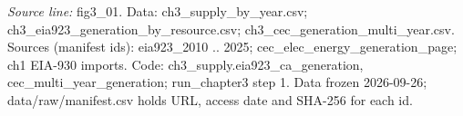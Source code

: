 {\scriptsize\textit{Source line:} fig3\_\allowbreak{}01. Data: ch3\_\allowbreak{}supply\_\allowbreak{}by\_\allowbreak{}year.csv; ch3\_\allowbreak{}eia923\_\allowbreak{}generation\_\allowbreak{}by\_\allowbreak{}resource.csv; ch3\_\allowbreak{}cec\_\allowbreak{}generation\_\allowbreak{}multi\_\allowbreak{}year.csv. Sources (manifest ids): eia923\_\allowbreak{}2010 .. 2025; cec\_\allowbreak{}elec\_\allowbreak{}energy\_\allowbreak{}generation\_\allowbreak{}page; ch1 EIA-930 imports. Code: ch3\_\allowbreak{}supply.eia923\_\allowbreak{}ca\_\allowbreak{}generation, cec\_\allowbreak{}multi\_\allowbreak{}year\_\allowbreak{}generation; run\_\allowbreak{}chapter3 step 1. Data frozen 2026-09-26; data/raw/manifest.csv holds URL, access date and SHA-256 for each id.}